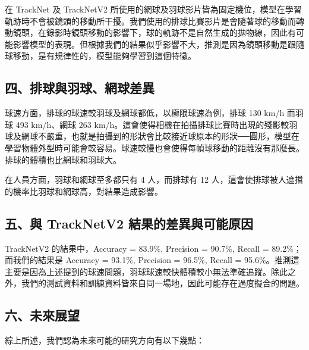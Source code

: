 在 TrackNet 及 TrackNetV2 所使用的網球及羽球影片皆為固定機位，模型在學習軌跡時不會被鏡頭的移動所干擾。我們使用的排球比賽影片是會隨著球的移動而轉動鏡頭，在錄影時鏡頭移動的影響下，球的軌跡不是自然生成的拋物線，因此有可能影響模型的表現。但根據我們的結果似乎影響不大，推測是因為鏡頭移動是跟隨球移動，是有規律性的，模型能夠學習到這個特徵。

\subsection{四、排球與羽球、網球差異}

球速方面，排球的球速較羽球及網球都低，以極限球速為例，排球 130 km/h 而羽球 493 km/h、網球 263 km/h。這會使得相機在拍攝排球比賽時出現的殘影較羽球及網球不嚴重，也就是拍攝到的形狀會比較接近球原本的形狀──圓形，模型在學習物體外型時可能會較容易。球速較慢也會使得每幀球移動的距離沒有那麼長。排球的體積也比網球和羽球大。

在人員方面，羽球和網球至多都只有 4 人，而排球有 12 人，這會使排球被人遮擋的機率比羽球和網球高，對結果造成影響。

\subsection{五、與 TrackNetV2 結果的差異與可能原因}

TrackNetV2 的結果中，Accuracy = 83.9\%, Precision = 90.7\%, Recall = 89.2\%；而我們的結果是 Accuracy = 93.1\%, Precision = 96.5\%, Recall = 95.6\%。推測這主要是因為上述提到的球速問題，羽球球速較快體積較小無法準確追蹤。除此之外，我們的測試資料和訓練資料皆來自同一場地，因此可能存在過度擬合的問題。

\subsection{六、未來展望}

綜上所述，我們認為未來可能的研究方向有以下幾點：

